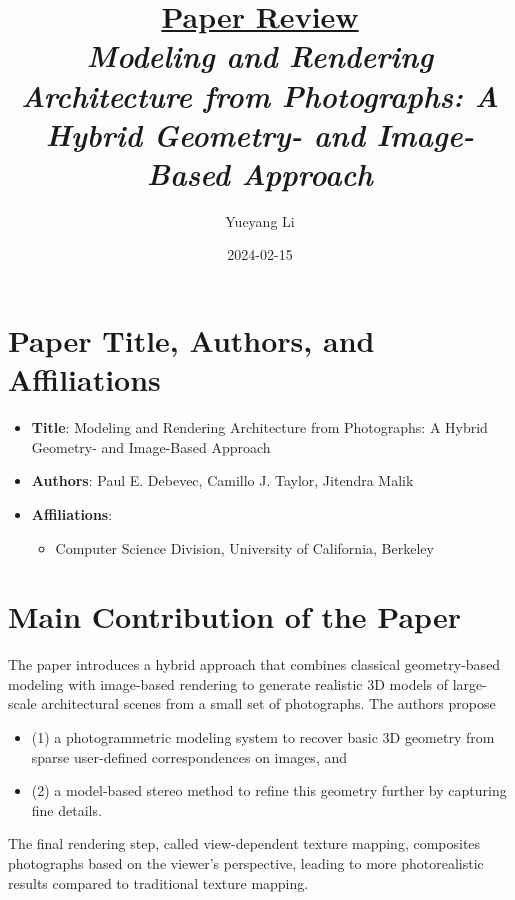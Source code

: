 \documentclass[12pt]{article}
\newcommand{\paperTitle}{
    \textit{\normalsize{Modeling and Rendering Architecture from Photographs: A Hybrid Geometry- and Image-Based Approach}}
}
\begin{document}
\title{\Large\uline{\textbf{Paper Review}} \\[0.4em]
\paperTitle{} 
}
\author{Yueyang Li}
\date{2024-02-15}

\maketitle

\section{Paper Title, Authors, and Affiliations}
\begin{itemize}[noitemsep]
    \item \textbf{Title}: Modeling and Rendering Architecture from Photographs: A Hybrid Geometry- and Image-Based Approach
    \item \textbf{Authors}: Paul E. Debevec, Camillo J. Taylor, Jitendra Malik
    \item \textbf{Affiliations}:
    \begin{itemize}[noitemsep]
        \item Computer Science Division, University of California, Berkeley
    \end{itemize}
\end{itemize}

\section{Main Contribution of the Paper}
The paper introduces a hybrid approach that combines classical geometry-based modeling with image-based rendering to generate realistic 3D models of large-scale architectural scenes from a small set of photographs. The authors propose 
\begin{itemize}[noitemsep]
    \item (1) a photogrammetric modeling system to recover basic 3D geometry from sparse user-defined correspondences on images, and 
    \item (2) a model-based stereo method to refine this geometry further by capturing fine details. 
\end{itemize}
The final rendering step, called view-dependent texture mapping, composites photographs based on the viewer's perspective, leading to more photorealistic results compared to traditional texture mapping.
\end{document}
